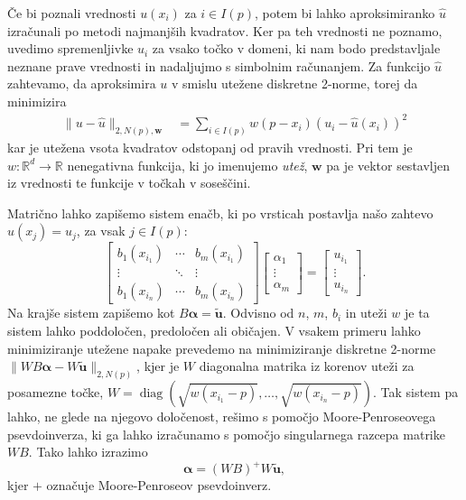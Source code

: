 \documentclass[12pt,a4paper,twoside]{article}
\theoremstyle{definition} %
\theoremstyle{plain} %
\numberwithin{equation}{section}
\newcommand{\R}{\mathbb R}
\renewcommand{\b}{\boldsymbol}
\newcommand{\uh}{\hat{u}}
\DeclareMathOperator{\diag}{diag}
\begin{document}
Če bi poznali vrednosti $u(x_i)$ za $i \in I(p)$, potem bi lahko aproksimiranko
$\uh$ izračunali po metodi najmanjših kvadratov. Ker pa teh vrednosti ne
poznamo, uvedimo spremenljivke $u_i$ za vsako točko v domeni, ki nam bodo
predstavljale neznane prave vrednosti in nadaljujmo
s simbolnim računanjem. Za funkcijo $\uh$ zahtevamo, da aproksimira $u$ v smislu
utežene diskretne 2-norme, torej da minimizira
\begin{align*}
  \|u-\uh\|_{2,N(p),\b{w}} &= \sum_{i\in I(p)} w(p-x_i) (u_i - \uh(x_i))^2
\end{align*}
kar je utežena vsota kvadratov odstopanj od pravih vrednosti. Pri tem je
$w\colon\R^d\to\R$ nenegativna funkcija, ki jo imenujemo \emph{utež}, $\b{w}$ pa
je vektor sestavljen iz vrednosti te funkcije v točkah v soseščini.

Matrično lahko zapišemo sistem enačb, ki po vrsticah
postavlja našo zahtevo $\hat{u}(x_j) = u_j$, za vsak $j \in I(p)$:
\begin{equation}
\begin{bmatrix}
  b_1(x_{i_1}) & \cdots & b_m(x_{i_1}) \\
  \vdots & \ddots & \vdots   \\
  b_1(x_{i_n}) & \cdots & b_m(x_{i_n})
\end{bmatrix}
\begin{bmatrix}
  \alpha_1 \\ \vdots \\ \alpha_m
\end{bmatrix}
=
\begin{bmatrix}
  u_{i_1} \\ \vdots \\ u_{i_n}
\end{bmatrix}.
  \label{eq:shape-system}
\end{equation}
Na krajše sistem zapišemo kot $B\b{\alpha} = \b{\tilde{u}}$. Odvisno od
$n$, $m$, $b_i$ in uteži $w$ je ta sistem lahko poddoločen, predoločen ali
običajen. V vsakem primeru lahko minimiziranje utežene napake prevedemo na
minimiziranje diskretne 2-norme $\|WB\b{\alpha}-W\b{\tilde{u}}\|_{2,N(p)}$, kjer je $W$
diagonalna matrika iz korenov uteži za posamezne točke, $W =
\diag(\sqrt{w(x_{i_1}-p)}, \dots, \sqrt{w(x_{i_n}-p)})$. Tak sistem pa lahko, ne
glede na njegovo določenost, rešimo s pomočjo Moore-Penroseovega
psevdoinverza, ki ga lahko izračunamo s pomočjo singularnega razcepa matrike
$WB$.
Tako lahko izrazimo \[ \b{\alpha} = (WB)^{+}W\b{\tilde u}, \]
kjer $+$ označuje Moore-Penroseov psevdoinverz.
\end{document}
